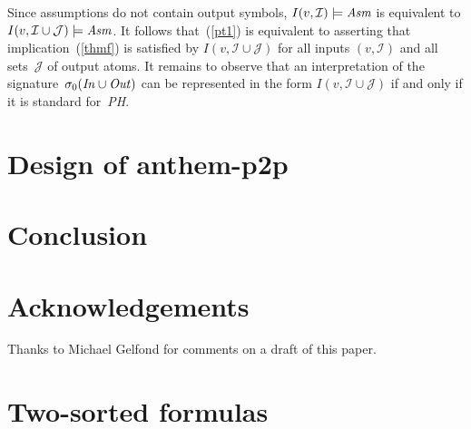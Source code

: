 \documentclass{new_tlp}
\newcommand{\I}{\mathcal{I}}
\newcommand{\J}{\mathcal{J}}
\begin{document}
Since assumptions do not contain output symbols,
$I(v,\I)\models\emph{Asm}$ is equivalent to $I(v,\I\cup\J)\models\emph{Asm}$.
It follows that~(\ref{pt1}) is equivalent to asserting that
implication~(\ref{thmf}) is satisfied by $I(v,\I\cup\J)$ for all
inputs $(v,\I)$ and all sets~$\J$ of output atoms.  It remains to observe
that an interpretation of the
signature~$\sigma_0(\emph{In\/}\cup\emph{Out\/})$ can be represented in
the form $I(v,\I\cup\J)$ if and only if it is
standard for~\emph{PH}.

\section{Design of {\sc anthem-p2p}} \label{sec:ontop}

\section{Conclusion}

\section*{Acknowledgements}

Thanks to Michael Gelfond for comments on a draft of this paper.




\appendix

\section{Two-sorted formulas} \label{appa}
\end{document}
